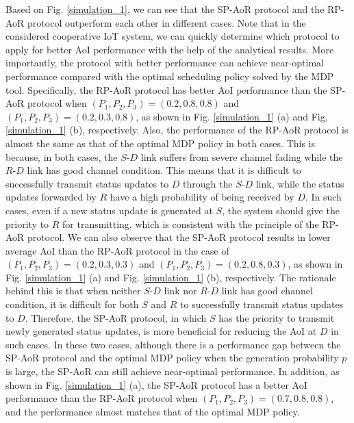 \documentclass{IEEEtran}
\begin{document}
Based on Fig. \ref{simulation_1}, we can see that the SP-AoR protocol and the RP-AoR protocol outperform each other in different cases. Note that in the considered cooperative IoT system, we can quickly determine which protocol to apply for better AoI performance with the help of the analytical results. More importantly, the protocol with better performance can achieve near-optimal performance compared with the optimal scheduling policy solved by the MDP tool. Specifically, the RP-AoR protocol has better AoI performance than the SP-AoR protocol when $(P_1, P_2,P_3)=(0.2,0.8,0.8)$ and $(P_1,P_2,P_3)=(0.2,0.3,0.8)$, as shown in Fig. \ref{simulation_1} (a) and Fig. \ref{simulation_1} (b), respectively. Also, the performance of the RP-AoR protocol is  almost the same as that of the optimal MDP policy in both cases. This is because, in both cases, the $S$-$D$ link suffers from severe channel fading while the $R$-$D$ link has good channel condition. This means that it is difficult to successfully transmit status updates to $D$ through the $S$-$D$ link, while the status updates forwarded by $R$ have a high probability of being received by $D$. In such cases, even if a new status update is generated at $S$, the system should give the priority to  $R$ for transmitting, which is consistent with the principle of the RP-AoR protocol. We can also observe that the SP-AoR protocol results in lower average AoI than the RP-AoR protocol in the case of $(P_1, P_2,P_3)=(0.2,0.3,0.3)$ and $(P_1, P_2,P_3)=(0.2,0.8,0.3)$, as shown in Fig. \ref{simulation_1} (a) and Fig. \ref{simulation_1} (b), respectively. The rationale behind this is that when neither $S$-$D$ link nor $R$-$D$ link has good channel condition, it is difficult for both $S$ and $R$ to successfully transmit status updates to $D$. Therefore, the SP-AoR protocol, in which $S$ has the priority to transmit newly generated status updates, is more beneficial for reducing the AoI at $D$ in such cases. In these two cases, although there is a performance gap between the SP-AoR protocol and the optimal MDP policy when the generation probability $p$ is large, the SP-AoR can still achieve near-optimal performance. In addition, as shown in Fig. \ref{simulation_1} (a), the SP-AoR protocol has a better AoI performance than the RP-AoR protocol when $(P_1,P_2,P_3)=(0.7,0.8,0.8)$, and the performance almost matches that of the optimal MDP policy. 

\end{document}
